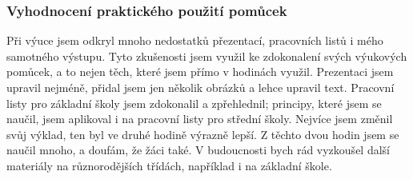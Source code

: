 \subsubsection{Vyhodnocení praktického použití pomůcek}
{Při výuce jsem odkryl mnoho nedostatků přezentací, pracovních listů i mého samotného výstupu. Tyto zkušenosti jsem využil ke zdokonalení svých výukových pomůcek, a to nejen těch, které jsem přímo v hodinách využil.}\odst
{Prezentaci jsem upravil nejméně, přidal jsem jen několik obrázků a lehce upravil text. Pracovní listy pro základní školy jsem zdokonalil a zpřehlednil; principy, které jsem se naučil, jsem aplikoval i na pracovní listy pro střední školy. Nejvíce jsem změnil svůj výklad, ten byl ve druhé hodině výrazně lepší.}\odst
{Z těchto dvou hodin jsem se naučil mnoho, a doufám, že žáci také. V budoucnosti bych rád vyzkoušel další materiály na různorodějších třídách, například i na základní škole.}
\newpage
